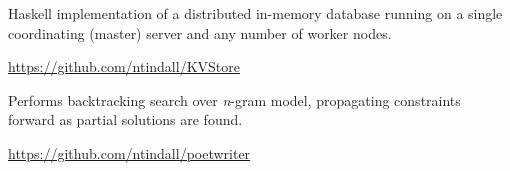 \documentclass[letterpaper]{deedy-resume} %
\begin{document}
\begin{minipage}[t]{0.66\textwidth}
\begin{tightitemize}
\item Haskell implementation of a distributed in-memory database running on a
single coordinating (master) server and any number of worker nodes.
\item \url{https://github.com/ntindall/KVStore}
\end{tightitemize}
\sectionspace %

\begin{tightitemize}
\item Performs backtracking search over \emph{n}-gram model, propagating constraints forward as partial solutions are found.
\item \url{https://github.com/ntindall/poetwriter}
\end{tightitemize}
\sectionspace %




%




\end{minipage} %
\end{document}
